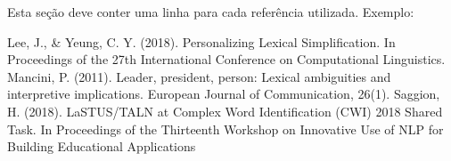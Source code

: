 \documentclass[11pt]{article}
\begin{document}
Esta seção deve conter uma linha para cada referência utilizada.
Exemplo:

Lee, J., \& Yeung, C. Y. (2018). Personalizing Lexical Simplification.
In Proceedings of the 27th International Conference on Computational
Linguistics. Mancini, P. (2011). Leader, president, person: Lexical
ambiguities and interpretive implications. European Journal of
Communication, 26(1). Saggion, H. (2018). LaSTUS/TALN at Complex Word
Identification (CWI) 2018 Shared Task. In Proceedings of the Thirteenth
Workshop on Innovative Use of NLP for Building Educational Applications


    
    
    
    
\end{document}
